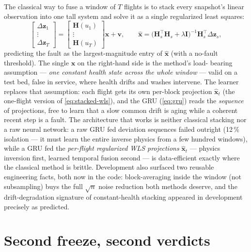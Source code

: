 The classical way to fuse a window of $T$ flights is to stack every snapshot's linear
observation into one tall system and solve it as a single regularized least squares:
\begin{equation}
  \begin{bmatrix} \Delta\mathbf{z}_1 \\ \vdots \\ \Delta\mathbf{z}_T \end{bmatrix}
  =
  \begin{bmatrix} \mathbf{H}(u_1) \\ \vdots \\ \mathbf{H}(u_T) \end{bmatrix} \mathbf{x}
  + \mathbf{v},
  \qquad
  \hat{\mathbf{x}} = \bigl(\mathbf{H}_s^{\!\top}\mathbf{H}_s + \lambda \mathbf{I}\bigr)^{-1}
  \mathbf{H}_s^{\!\top} \Delta\mathbf{z}_s,
  \label{eq:stacked-wls}
\end{equation}
predicting the fault as the largest-magnitude entry of $\hat{\mathbf{x}}$ (with a
no-fault threshold). The single $\mathbf{x}$ on the right-hand side is the method's load-
bearing assumption --- \emph{one constant health state across the whole window} --- valid
on a test bed, false in service, where health drifts and washes intervene. The learner
replaces that assumption: each flight gets its own per-block projection
$\hat{\mathbf{x}}_t$ (the one-flight version of \cref{eq:stacked-wls}), and the GRU
(\cref{eq:gru}) reads the \emph{sequence} of projections, free to learn that a slow common
drift is aging while a coherent recent step is a fault. The architecture
that works is neither classical stacking nor a raw neural network: a raw GRU fed deviation
sequences failed outright (12\,\% isolation --- it must learn the entire inverse physics
from a few hundred windows), while a GRU fed the \emph{per-flight regularized WLS
projections} $\hat{\mathbf{x}}_t$ --- physics inversion first, learned temporal fusion
second --- is data-efficient exactly where the classical method is brittle. Development
also surfaced two reusable engineering facts, both now in the code: block-averaging inside
the window (not subsampling) buys the full $\sqrt{n}$ noise reduction both methods deserve,
and the drift-degradation signature of constant-health stacking appeared in development
precisely as predicted.

\section{Second freeze, second verdicts}
\label{sec:tomo-verdicts}

